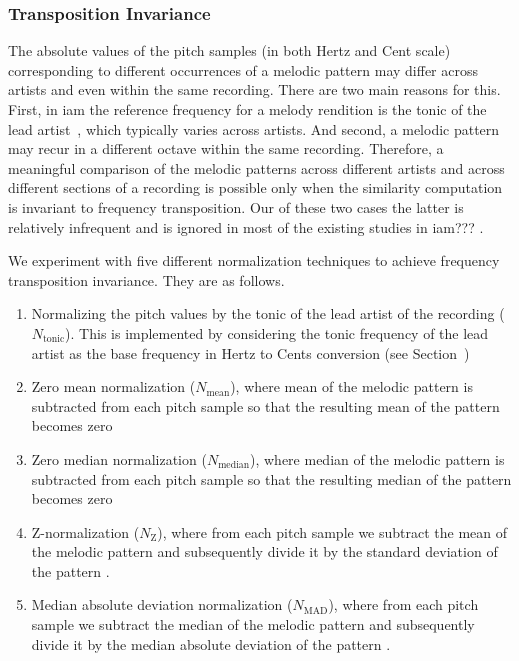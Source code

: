 \subsubsection{Transposition Invariance}
\label{sec:patterns_melodic_similarity_transposition_invariance}

The absolute values of the pitch samples (in both Hertz and Cent scale) corresponding to different occurrences of a melodic pattern may differ across artists and even within the same recording. There are two main reasons for this. First, in \gls{iam} the reference frequency for a melody rendition is the tonic of the lead artist~\citep{Gulati2014Tonic}, which typically varies across artists. And second, a melodic pattern may recur in a different octave within the same recording. Therefore, a meaningful comparison of the melodic patterns across different artists and across different sections of a recording is possible only when the similarity computation is invariant to frequency transposition. Our of these two cases the latter is relatively infrequent and is ignored in most of the existing studies in \gls{iam}??? .

We experiment with five different normalization techniques to achieve frequency transposition invariance. They are as follows. 
\begin{enumerate}
	\item Normalizing the pitch values by the tonic of the lead artist of the recording ($N_{\mathrm{tonic}}$). This is implemented by considering the tonic frequency of the lead artist as the base frequency in Hertz to Cents conversion (see Section~)
	\item Zero mean normalization ($N_{\mathrm{mean}}$), where mean of the melodic pattern is subtracted from each pitch sample so that the resulting mean of the pattern becomes zero
	\item Zero median normalization ($N_{\mathrm{median}}$), where median of the melodic pattern is subtracted from each pitch sample so that the resulting median of the pattern becomes zero
	\item Z-normalization ($N_{\mathrm{Z}}$), where from each pitch sample we subtract the mean of the melodic pattern and subsequently divide it by the standard deviation of the pattern .
	\item Median absolute deviation normalization ($N_{\mathrm{MAD}}$), where from each pitch sample we subtract the median of the melodic pattern and subsequently divide it by the median absolute deviation of the pattern .
\end{enumerate}

